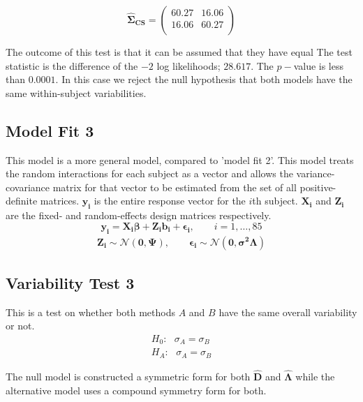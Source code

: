 \begin{equation}
\boldsymbol{\hat{\Sigma}_{CS}} = \left( \begin{array}{cc}
60.27  & 16.06  \\
16.06  & 60.27  \\
\end{array}\right)
\end{equation}

The outcome of this test is that it can be assumed that they have equal
The test statistic is the difference of the $-2$ log likelihoods; $28.617$. The $p-$value is less than $0.0001$. In this case we reject the null hypothesis that both models have the same within-subject variabilities.

\subsection{Model Fit 3}

This model is a more general model, compared to 'model fit 2'. This model treats the random interactions for each subject as a vector and
allows the variance-covariance matrix for that vector to be estimated from the set of all positive-definite matrices.
$\boldsymbol{y_{i}}$ is the entire response vector for the $i$th subject.
$\boldsymbol{X_{i}}$ and $\boldsymbol{Z_{i}}$  are the fixed- and random-effects design matrices respectively.
\begin{equation*}
\boldsymbol{y_{i}} = \boldsymbol{X_{i}\beta}  + \boldsymbol{Z_{i}b_{i}} + \boldsymbol{\epsilon_{i}}, \qquad i=1,\dots,85
\end{equation*}
\begin{eqnarray*}
\boldsymbol{Z_{i}} \sim \mathcal{N}(\boldsymbol{0,\Psi}),\qquad
\boldsymbol{\epsilon_{i}} \sim \mathcal{N}(\boldsymbol{0,\sigma^2\Lambda})
\end{eqnarray*}


\subsection{Variability Test 3}
This is a test on whether both methods $A$ and $B$ have the same overall variability or not.
\begin{eqnarray}
H_{0}: \mbox{ }\sigma_{A}  = \sigma_{B} \\
H_{A}: \mbox{ }\sigma_{A}  = \sigma_{B}
\end{eqnarray}

The null model is constructed a symmetric form for both $\boldsymbol{\hat{D}}$ and $\boldsymbol{\hat{\Lambda}}$ while the alternative model uses a compound symmetry form for both.

